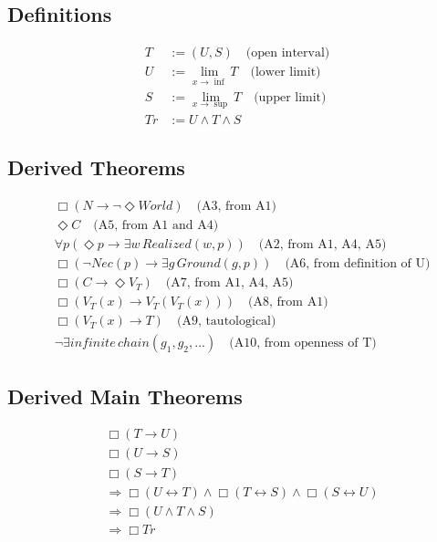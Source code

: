 \documentclass[
]{article}
\begin{document}
\subsection{Definitions}\label{definitions}

\[
\begin{aligned}
T &:= (U, S) \quad \text{(open interval)} \\
U &:= \lim_{x \to \inf} T \quad \text{(lower limit)} \\
S &:= \lim_{x \to \sup} T \quad \text{(upper limit)} \\
Tr &:= U \land T \land S
\end{aligned}
\]

\subsection{Derived Theorems}\label{derived-theorems}

\[
\begin{aligned}
& \Box(N \rightarrow \neg\Diamond World) \quad \text{(A3, from A1)} \\
& \Diamond C \quad \text{(A5, from A1 and A4)} \\
& \forall p(\Diamond p \rightarrow \exists w\, Realized(w,p)) \quad \text{(A2, from A1, A4, A5)} \\
& \Box(\neg Nec(p) \rightarrow \exists g\, Ground(g,p)) \quad \text{(A6, from definition of U)} \\
& \Box(C \rightarrow \Diamond V_T) \quad \text{(A7, from A1, A4, A5)} \\
& \Box(V_T(x) \rightarrow V_T(V_T(x))) \quad \text{(A8, from A1)} \\
& \Box(V_T(x) \rightarrow T) \quad \text{(A9, tautological)} \\
& \neg\exists infinite\, chain(g_1, g_2, ...) \quad \text{(A10, from openness of T)}
\end{aligned}
\]

\subsection{Derived Main Theorems}\label{derived-main-theorems}

\[
\begin{aligned}
& \Box(T \rightarrow U) \\
& \Box(U \rightarrow S) \\
& \Box(S \rightarrow T) \\
& \Rightarrow \Box(U \leftrightarrow T) \land \Box(T \leftrightarrow S) \land \Box(S \leftrightarrow U) \\
& \Rightarrow \Box(U \land T \land S) \\
& \Rightarrow \Box Tr
\end{aligned}
\]
\end{document}

